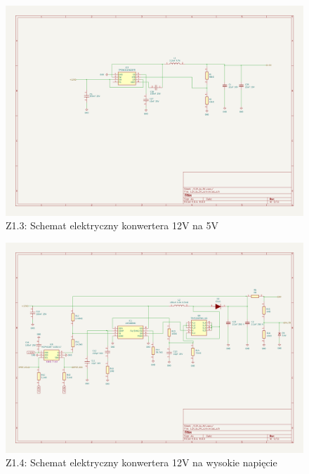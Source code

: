 \documentclass[twoside]{article}
\numberwithin{equation}{section}
\begin{document}
\newpage
\thispagestyle{empty}
\begin{figure}[H]
    \centering
    \includegraphics[width=1.5\textwidth, angle=90]{zalaczniki/3.png}
    \caption*{Z1.3: Schemat elektryczny konwertera 12V na 5V}
\end{figure}

\newpage
\thispagestyle{empty}
\begin{figure}[H]
    \centering
    \includegraphics[width=1.5\textwidth, angle=90]{zalaczniki/4.png}
    \caption*{Z1.4: Schemat elektryczny konwertera 12V na wysokie napięcie}
\end{figure}
\end{document}

